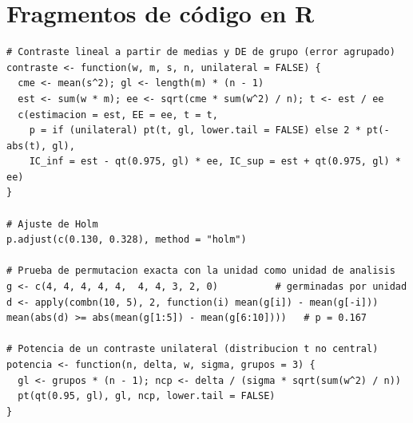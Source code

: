 \documentclass[11pt]{article}
\begin{document}
\section{Fragmentos de código en R}

\begin{verbatim}
# Contraste lineal a partir de medias y DE de grupo (error agrupado)
contraste <- function(w, m, s, n, unilateral = FALSE) {
  cme <- mean(s^2); gl <- length(m) * (n - 1)
  est <- sum(w * m); ee <- sqrt(cme * sum(w^2) / n); t <- est / ee
  c(estimacion = est, EE = ee, t = t,
    p = if (unilateral) pt(t, gl, lower.tail = FALSE) else 2 * pt(-abs(t), gl),
    IC_inf = est - qt(0.975, gl) * ee, IC_sup = est + qt(0.975, gl) * ee)
}

# Ajuste de Holm
p.adjust(c(0.130, 0.328), method = "holm")

# Prueba de permutacion exacta con la unidad como unidad de analisis
g <- c(4, 4, 4, 4, 4,  4, 4, 3, 2, 0)          # germinadas por unidad
d <- apply(combn(10, 5), 2, function(i) mean(g[i]) - mean(g[-i]))
mean(abs(d) >= abs(mean(g[1:5]) - mean(g[6:10])))   # p = 0.167

# Potencia de un contraste unilateral (distribucion t no central)
potencia <- function(n, delta, w, sigma, grupos = 3) {
  gl <- grupos * (n - 1); ncp <- delta / (sigma * sqrt(sum(w^2) / n))
  pt(qt(0.95, gl), gl, ncp, lower.tail = FALSE)
}
\end{verbatim}
\end{document}
